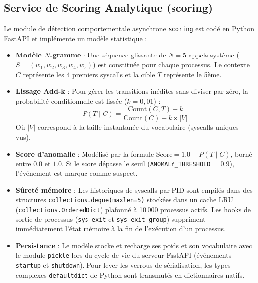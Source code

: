 \documentclass[11pt,a4paper]{article}
\begin{document}
\subsection{Service de Scoring Analytique (scoring)}
Le module de détection comportementale asynchrone \texttt{scoring} est codé en Python FastAPI et implémente un modèle statistique :
\begin{itemize}
    \item \textbf{Modèle $N$-gramme} : Une séquence glissante de $N=5$ appels système ($S = (w_1, w_2, w_3, w_4, w_5)$) est constituée pour chaque processus. Le contexte $C$ représente les 4 premiers syscalls et la cible $T$ représente le 5ème.
    \item \textbf{Lissage Add-k} : Pour gérer les transitions inédites sans diviser par zéro, la probabilité conditionnelle est lissée ($k=0{,}01$) :
    \[ P(T \mid C) = \frac{\text{Count}(C, T) + k}{\text{Count}(C) + k \times |V|} \]
    Où $|V|$ correspond à la taille instantanée du vocabulaire (syscalls uniques vus).
    \item \textbf{Score d'anomalie} : Modélisé par la formule $\text{Score} = 1.0 - P(T \mid C)$, borné entre $0.0$ et $1.0$. Si le score dépasse le seuil (\texttt{ANOMALY\_THRESHOLD} = 0.9), l'événement est marqué comme suspect.
    \item \textbf{Sûreté mémoire} : Les historiques de syscalls par PID sont empilés dans des structures \texttt{collections.deque(maxlen=5)} stockées dans un cache LRU (\texttt{collections.OrderedDict}) plafonné à 10\,000 processus actifs. Les hooks de sortie de processus (\texttt{sys\_exit} et \texttt{sys\_exit\_group}) suppriment immédiatement l'état mémoire à la fin de l'exécution d'un processus.
    \item \textbf{Persistance} : Le modèle stocke et recharge ses poids et son vocabulaire avec le module \texttt{pickle} lors du cycle de vie du serveur FastAPI (événements \texttt{startup} et \texttt{shutdown}). Pour lever les verrous de sérialisation, les types complexes \texttt{defaultdict} de Python sont transmutés en dictionnaires natifs.
\end{itemize}
\end{document}
